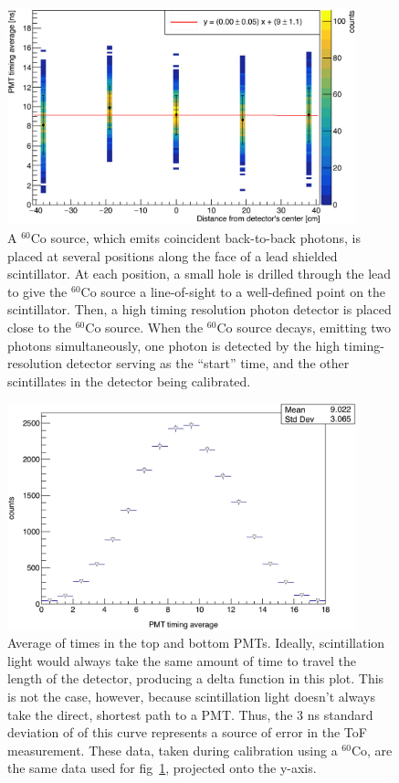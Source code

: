 \begin{figure}[H]
    \centering
    \includegraphics[width = 0.9\textwidth]{Content/Methods/CO60Validation.png}
    \caption{A $^{60}$Co source, which emits coincident back-to-back photons, is placed at several positions along the face of a lead shielded scintillator.
    At each position, a small hole is drilled through the lead to give the $^{60}$Co source a line-of-sight to a well-defined point on the scintillator.
    Then, a high timing resolution photon detector is placed close to the $^{60}$Co source.
    When the $^{60}$Co source decays, emitting two photons simultaneously, one photon is detected by the high timing-resolution detector serving as the ``start'' time, and the other scintillates in the detector being calibrated.}
    \label{fig:Co60Validation}
\end{figure}
\begin{figure}
    \centering
    \includegraphics[width = 0.9\textwidth]{Content/Methods/CO60ValidationProject.png}
    \caption{Average of times in the top and bottom PMTs.
    Ideally, scintillation light would always take the same amount of time to travel the length of the detector, producing a delta function in this plot.
    This is not the case, however, because scintillation light doesn't always take the direct, shortest path to a PMT.
    Thus, the 3 ns standard deviation of of this curve represents a source of error in the ToF measurement.
    These data, taken during calibration using a $^{60}$Co, are the same data used for fig~\ref{fig:Co60Validation}, projected onto the y-axis.
}
    \label{fig:Co60ValidationProject}
\end{figure}

